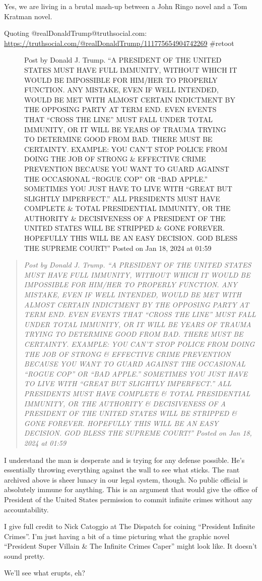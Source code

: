 Yes, we are living in a brutal mash-up between a John Ringo novel and a
Tom Kratman novel.

Quoting @realDonaldTrump@truthsocial.com:
\url{https://truthsocial.com/@realDonaldTrump/111775654904742269}
\#retoot

\begin{figure}
\centering
{}
\caption{Post by Donald J. Trump. ``A PRESIDENT OF THE UNITED STATES
MUST HAVE FULL IMMUNITY, WITHOUT WHICH IT WOULD BE IMPOSSIBLE FOR
HIM/HER TO PROPERLY FUNCTION. ANY MISTAKE, EVEN IF WELL INTENDED, WOULD
BE MET WITH ALMOST CERTAIN INDICTMENT BY THE OPPOSING PARTY AT TERM END.
EVEN EVENTS THAT ``CROSS THE LINE'' MUST FALL UNDER TOTAL IMMUNITY, OR
IT WILL BE YEARS OF TRAUMA TRYING TO DETERMINE GOOD FROM BAD. THERE MUST
BE CERTAINTY. EXAMPLE: YOU CAN'T STOP POLICE FROM DOING THE JOB OF
STRONG \& EFFECTIVE CRIME PREVENTION BECAUSE YOU WANT TO GUARD AGAINST
THE OCCASIONAL ``ROGUE COP'' OR ``BAD APPLE.'' SOMETIMES YOU JUST HAVE
TO LIVE WITH ``GREAT BUT SLIGHTLY IMPERFECT.'' ALL PRESIDENTS MUST HAVE
COMPLETE \& TOTAL PRESIDENTIAL IMMUNITY, OR THE AUTHORITY \&
DECISIVENESS OF A PRESIDENT OF THE UNITED STATES WILL BE STRIPPED \&
GONE FOREVER. HOPEFULLY THIS WILL BE AN EASY DECISION. GOD BLESS THE
SUPREME COURT!'' Posted on Jan 18, 2024 at 01:59}
\end{figure}

\begin{quote}
\emph{Post by Donald J. Trump. ``A PRESIDENT OF THE UNITED STATES MUST
HAVE FULL IMMUNITY, WITHOUT WHICH IT WOULD BE IMPOSSIBLE FOR HIM/HER TO
PROPERLY FUNCTION. ANY MISTAKE, EVEN IF WELL INTENDED, WOULD BE MET WITH
ALMOST CERTAIN INDICTMENT BY THE OPPOSING PARTY AT TERM END. EVEN EVENTS
THAT ``CROSS THE LINE'' MUST FALL UNDER TOTAL IMMUNITY, OR IT WILL BE
YEARS OF TRAUMA TRYING TO DETERMINE GOOD FROM BAD. THERE MUST BE
CERTAINTY. EXAMPLE: YOU CAN'T STOP POLICE FROM DOING THE JOB OF STRONG
\& EFFECTIVE CRIME PREVENTION BECAUSE YOU WANT TO GUARD AGAINST THE
OCCASIONAL ``ROGUE COP'' OR ``BAD APPLE.'' SOMETIMES YOU JUST HAVE TO
LIVE WITH ``GREAT BUT SLIGHTLY IMPERFECT.'' ALL PRESIDENTS MUST HAVE
COMPLETE \& TOTAL PRESIDENTIAL IMMUNITY, OR THE AUTHORITY \&
DECISIVENESS OF A PRESIDENT OF THE UNITED STATES WILL BE STRIPPED \&
GONE FOREVER. HOPEFULLY THIS WILL BE AN EASY DECISION. GOD BLESS THE
SUPREME COURT!'' Posted on Jan 18, 2024 at 01:59}
\end{quote}

I understand the man is desperate and is trying for any defense
possible. He's essentially throwing everything against the wall to see
what sticks. The rant archived above is sheer lunacy in our legal
system, though. No public official is absolutely immune for anything.
This is an argument that would give the office of President of the
United States permission to commit infinite crimes without any
accountability.

I give full credit to Nick Catoggio at The Dispatch for coining
``President Infinite Crimes''. I'm just having a bit of a time picturing
what the graphic novel ``President Super Villain \& The Infinite Crimes
Caper'' might look like. It doesn't sound pretty.

We'll see what erupts, eh?
